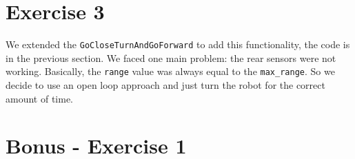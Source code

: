 \documentclass[11pt]{article}
\begin{document}
\section{Exercise 3}
We extended the \texttt{GoCloseTurnAndGoForward} to add this functionality, the code is in the previous section. We faced one main problem: the rear sensors were not working. Basically, the \texttt{range} value was always equal to the \texttt{max\_range}. So we decide to use an open loop approach and just turn the robot for the correct amount of time.

\section{Bonus - Exercise 1}
\end{document}
